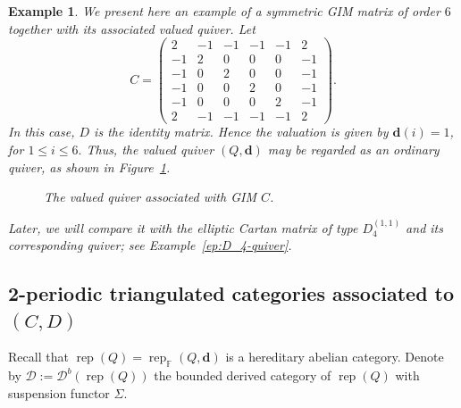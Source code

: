 \documentclass[12pt,reqno]{amsart}
\numberwithin{equation}{section}
\newcommand{\rep}{\operatorname{rep}\nolimits}
\newtheorem{example}[theorem]{Example}
\begin{document}
	\begin{example}\label{ep:GIM-quiver}
		We present here an example of a symmetric GIM matrix of order $6$ together with its associated valued quiver. Let
		\[
		C=
		\begin{pmatrix}
			2 & -1 & -1 & -1 & -1 & 2 \\
			-1 & 2 & 0 & 0 & 0 & -1 \\
			-1 & 0 & 2 & 0 & 0 & -1 \\
			-1 & 0 & 0 & 2 & 0 & -1 \\
			-1 & 0 & 0 & 0 & 2 & -1 \\
			2 & -1 & -1 & -1 & -1 & 2 
		\end{pmatrix}.
		\]
		In this case, $D$ is the identity matrix. Hence the valuation is given by
		$\mathbf{d}(i)=1$, for $1\leq i\leq 6.$
		Thus, the valued quiver $(Q,\mathbf d)$ may be regarded as an ordinary quiver, as shown in Figure~\ref{fig:quiver-GIM}.
		\begin{figure}[htbp]
			\centering
			\caption{The valued quiver associated with GIM $C$.}
			\label{fig:quiver-GIM}
		\end{figure}
		Later, we will compare it with the elliptic Cartan matrix of type $D_4^{(1,1)}$ and its corresponding quiver; see Example~\ref{ep:D_4-quiver}.
	\end{example}
	
	
	
	\subsection{2-periodic triangulated categories associated to $(C,D)$}\label{ss:2-periodic-(C,D)}
	Recall that $\rep(Q)=\rep_{\mathbb{F}}(Q,\mathbf{d})$ is a hereditary abelian category. Denote by $\mathcal{D}:=\mathcal{D}^b(\rep(Q))$ the bounded derived category of $\rep(Q)$ with suspension functor $\Sigma$.
	
\end{document}
